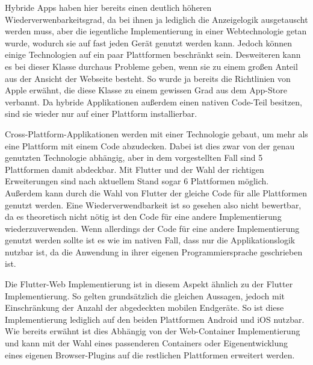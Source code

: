 Hybride Apps haben hier bereits einen deutlich höheren Wiederverwenbarkeitsgrad, da bei ihnen ja lediglich die Anzeigelogik ausgetauscht werden muss, aber die iegentliche Implementierung in einer Webtechnologie getan wurde, wodurch sie auf fast jeden Gerät genutzt werden kann. Jedoch können einige Technologien auf ein paar Plattformen beschränkt sein. Desweiteren kann es bei dieser Klasse durchaus Probleme geben, wenn sie zu einem großen Anteil aus der Ansicht der Webseite besteht. So wurde ja bereits die Richtlinien von Apple erwähnt, die diese Klasse zu einem gewissen Grad aus dem App-Store verbannt. Da hybride Applikationen außerdem einen nativen Code-Teil besitzen, sind sie wieder nur auf einer Plattform installierbar. 

Cross-Plattform-Applikationen werden mit einer Technologie gebaut, um mehr als eine Plattform mit einem Code abzudecken. Dabei ist dies zwar von der genau genutzten Technologie abhängig, aber in dem vorgestellten Fall sind 5 Plattformen damit abdeckbar. Mit Flutter und der Wahl der richtigen Erweiterungen sind nach aktuellem Stand sogar 6 Plattformen möglich. Außerdem kann durch die Wahl von Flutter der gleiche Code für alle Plattformen genutzt werden. Eine Wiederverwendbarkeit ist so gesehen also nicht bewertbar, da es theoretisch nicht nötig ist den Code für eine andere Implementierung wiederzuverwenden. Wenn allerdings der Code für eine andere Implementierung genutzt werden sollte ist es wie im nativen Fall, dass nur die Applikationslogik nutzbar ist, da die Anwendung in ihrer eigenen Programmiersprache geschrieben ist.

Die Flutter-Web Implementierung ist in diesem Aspekt ähnlich zu der Flutter Implementierung. So gelten grundsätzlich die gleichen Aussagen, jedoch mit Einschränkung der Anzahl der abgedeckten mobilen Endgeräte. So ist diese Implementierung lediglich auf den beiden Plattformen Android und iOS nutzbar. Wie bereits erwähnt ist dies Abhängig von der Web-Container Implementierung und kann mit der Wahl eines passenderen Containers oder Eigenentwicklung eines eigenen Browser-Plugins auf die restlichen Plattformen erweitert werden.

